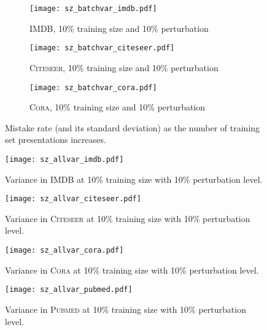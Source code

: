 \documentclass[a4paper,final,notitlepage,11pt,svgnames]{article}
\newcommand{\cora}{\textsc{Cora}}
\newcommand{\citeseer}{\textsc{Citeseer}}
\newcommand{\pubmed}{\textsc{Pubmed}}
\newcommand{\imdb}{\textsc{IMDB}}
\begin{document}
\newpage
{}
\pagestyle{empty}
\begin{figure*}[!p]
	\centering
	\begin{subfigure}[b]{.945\textwidth}
		\centering
		\texttt{[image: sz\_batchvar\_imdb.pdf]}
		\caption{\imdb{}, 10\% training size and 10\% perturbation}
	\end{subfigure}
	\begin{subfigure}[b]{.945\textwidth}
		\centering
		\texttt{[image: sz\_batchvar\_citeseer.pdf]}
		\caption{\citeseer{}, 10\% training size and 10\% perturbation}
	\end{subfigure}
	\begin{subfigure}[b]{.945\textwidth}
		\centering
		\texttt{[image: sz\_batchvar\_cora.pdf]}
		\caption{\cora{}, 10\% training size and 10\% perturbation}
	\end{subfigure}
	\caption{Mistake rate (and its standard deviation) as the number of training
    set presentations increases.\label{fig:batch_variance}}
\end{figure*}
\clearpage
\restoregeometry
\fi

\newpage

\pagestyle{empty}








\newpage
\pagestyle{empty}
\begin{figure}[!t]
  \centering
  \texttt{[image: sz\_allvar\_imdb.pdf]}
  \caption{Variance in \imdb{} at 10\% training size with 10\% perturbation level.\label{fig:imdb_var}}
\end{figure}
\begin{figure}[!b]
  \centering
  \texttt{[image: sz\_allvar\_citeseer.pdf]}
  \caption{Variance in \citeseer{} at 10\% training size with 10\% perturbation level.\label{fig:citeseer_var}}
\end{figure}

\begin{figure}[!t]
  \centering
  \texttt{[image: sz\_allvar\_cora.pdf]}
  \caption{Variance in \cora{} at 10\% training size with 10\% perturbation level.\label{fig:cora_var}}
\end{figure}
\begin{figure}[!b]
  \centering
  \texttt{[image: sz\_allvar\_pubmed.pdf]}
  \caption{Variance in \pubmed{} at 10\% training size with 10\% perturbation level.\label{fig:pubmed_var}}
\end{figure}
\end{document}
